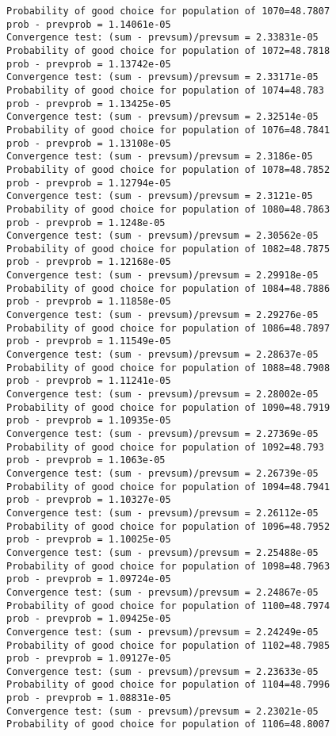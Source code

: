 \documentclass[11pt,onecolumn]{article}
\begin{document}
\begin{verbatim}
Probability of good choice for population of 1070=48.7807
prob - prevprob = 1.14061e-05
Convergence test: (sum - prevsum)/prevsum = 2.33831e-05
Probability of good choice for population of 1072=48.7818
prob - prevprob = 1.13742e-05
Convergence test: (sum - prevsum)/prevsum = 2.33171e-05
Probability of good choice for population of 1074=48.783
prob - prevprob = 1.13425e-05
Convergence test: (sum - prevsum)/prevsum = 2.32514e-05
Probability of good choice for population of 1076=48.7841
prob - prevprob = 1.13108e-05
Convergence test: (sum - prevsum)/prevsum = 2.3186e-05
Probability of good choice for population of 1078=48.7852
prob - prevprob = 1.12794e-05
Convergence test: (sum - prevsum)/prevsum = 2.3121e-05
Probability of good choice for population of 1080=48.7863
prob - prevprob = 1.1248e-05
Convergence test: (sum - prevsum)/prevsum = 2.30562e-05
Probability of good choice for population of 1082=48.7875
prob - prevprob = 1.12168e-05
Convergence test: (sum - prevsum)/prevsum = 2.29918e-05
Probability of good choice for population of 1084=48.7886
prob - prevprob = 1.11858e-05
Convergence test: (sum - prevsum)/prevsum = 2.29276e-05
Probability of good choice for population of 1086=48.7897
prob - prevprob = 1.11549e-05
Convergence test: (sum - prevsum)/prevsum = 2.28637e-05
Probability of good choice for population of 1088=48.7908
prob - prevprob = 1.11241e-05
Convergence test: (sum - prevsum)/prevsum = 2.28002e-05
Probability of good choice for population of 1090=48.7919
prob - prevprob = 1.10935e-05
Convergence test: (sum - prevsum)/prevsum = 2.27369e-05
Probability of good choice for population of 1092=48.793
prob - prevprob = 1.1063e-05
Convergence test: (sum - prevsum)/prevsum = 2.26739e-05
Probability of good choice for population of 1094=48.7941
prob - prevprob = 1.10327e-05
Convergence test: (sum - prevsum)/prevsum = 2.26112e-05
Probability of good choice for population of 1096=48.7952
prob - prevprob = 1.10025e-05
Convergence test: (sum - prevsum)/prevsum = 2.25488e-05
Probability of good choice for population of 1098=48.7963
prob - prevprob = 1.09724e-05
Convergence test: (sum - prevsum)/prevsum = 2.24867e-05
Probability of good choice for population of 1100=48.7974
prob - prevprob = 1.09425e-05
Convergence test: (sum - prevsum)/prevsum = 2.24249e-05
Probability of good choice for population of 1102=48.7985
prob - prevprob = 1.09127e-05
Convergence test: (sum - prevsum)/prevsum = 2.23633e-05
Probability of good choice for population of 1104=48.7996
prob - prevprob = 1.08831e-05
Convergence test: (sum - prevsum)/prevsum = 2.23021e-05
Probability of good choice for population of 1106=48.8007

\end{verbatim}
\end{document}
